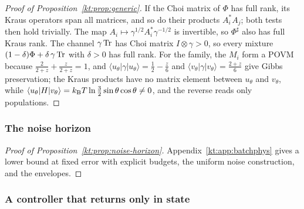 \begin{proof}[Proof of Proposition~\ref{kt:prop:generic}]
If the Choi matrix of $\Phi$ has full rank, its Kraus operators span all matrices, and so do their products $A_i^*A_j$; both tests then hold trivially. The map $A_i\mapsto\gamma^{1/2}A_i^*\gamma^{-1/2}$ is invertible, so $\Phi^\sharp$ also has full Kraus rank. The channel $\gamma\operatorname{Tr}$ has Choi matrix $I\otimes\gamma>0$, so every mixture $(1-\delta)\Phi+\delta\,\gamma\operatorname{Tr}$ with $\delta>0$ has full rank. For the family, the $M_i$ form a POVM because $\frac2{2+z}+\frac z{2+z}=1$, and $\langle u_\theta|\gamma|u_\theta\rangle=\frac12-\frac z6$ and $\langle v_\theta|\gamma|v_\theta\rangle=\frac{2+z}6$ give Gibbs preservation; the Kraus products have no matrix element between $u_\theta$ and $v_\theta$, while $\langle u_\theta|H|v_\theta\rangle=k_{\mathrm B} T\ln\frac32\sin\theta\cos\theta\ne0$, and the reverse reads only populations.
\end{proof}

\subsubsection{The noise horizon}\label{kt:pf:noise}

\begin{proof}[Proof of Proposition~\ref{kt:prop:noise-horizon}]
Appendix~\ref{kt:app:batchphys} gives a lower bound at fixed error with explicit budgets, the uniform noise construction, and the envelopes.
\end{proof}

\subsubsection{A controller that returns only in state}\label{kt:pf:embezzle}

